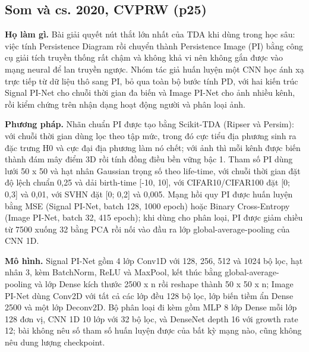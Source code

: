 \documentclass[12pt,a4paper]{article}
\begin{document}
\subsection{Som và cs. 2020, CVPRW \normalfont\small (p25)}
\par\vspace{2pt}
\par\vspace{4pt}
\noindent \textbf{Họ làm gì.} Bài giải quyết nút thắt lớn nhất của TDA khi dùng trong học sâu: việc tính Persistence Diagram rồi chuyển thành Persistence Image (PI) bằng công cụ giải tích truyền thống rất chậm và không khả vi nên không gắn được vào mạng neural để lan truyền ngược. Nhóm tác giả huấn luyện một CNN học ánh xạ trực tiếp từ dữ liệu thô sang PI, bỏ qua toàn bộ bước tính PD, với hai kiến trúc Signal PI-Net cho chuỗi thời gian đa biến và Image PI-Net cho ảnh nhiều kênh, rồi kiểm chứng trên nhận dạng hoạt động người và phân loại ảnh.\par\vspace{3pt}
\noindent \textbf{Phương pháp.} Nhãn chuẩn PI được tạo bằng Scikit-TDA (Ripser và Persim): với chuỗi thời gian dùng lọc theo tập mức, trong đó cực tiểu địa phương sinh ra đặc trưng H0 và cực đại địa phương làm nó chết; với ảnh thì mỗi kênh được biến thành đám mây điểm 3D rồi tính đồng điều bền vững bậc 1. Tham số PI dùng lưới 50 x 50 và hạt nhân Gaussian trọng số theo life-time, với chuỗi thời gian đặt độ lệch chuẩn 0,25 và dải birth-time [-10, 10], với CIFAR10/CIFAR100 đặt [0; 0,3] và 0,01, với SVHN đặt [0; 0,2] và 0,005. Mạng hồi quy PI được huấn luyện bằng MSE (Signal PI-Net, batch 128, 1000 epoch) hoặc Binary Cross-Entropy (Image PI-Net, batch 32, 415 epoch); khi dùng cho phân loại, PI được giảm chiều từ 7500 xuống 32 bằng PCA rồi nối vào đầu ra lớp global-average-pooling của CNN 1D.\par\vspace{3pt}
\noindent \textbf{Mô hình.} Signal PI-Net gồm 4 lớp Conv1D với 128, 256, 512 và 1024 bộ lọc, hạt nhân 3, kèm BatchNorm, ReLU và MaxPool, kết thúc bằng global-average-pooling và lớp Dense kích thước 2500 x n rồi reshape thành 50 x 50 x n; Image PI-Net dùng Conv2D với tất cả các lớp đều 128 bộ lọc, lớp biến tiềm ẩn Dense 2500 và một lớp Deconv2D. Bộ phân loại đi kèm gồm MLP 8 lớp Dense mỗi lớp 128 đơn vị, CNN 1D 10 lớp với 32 bộ lọc, và DenseNet depth 16 với growth rate 12; bài không nêu số tham số huấn luyện được của bất kỳ mạng nào, cũng không nêu dung lượng checkpoint.\par\vspace{3pt}
\end{document}
